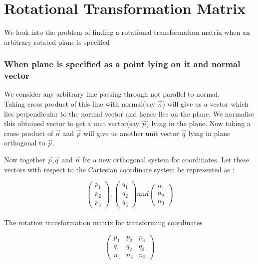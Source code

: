 \documentclass[a4paper,11pt,openany]{book}
\begin{document}
\chapter{Rotational Transformation Matrix}
We look into the problem of finding a rotational transformation matrix when an arbitrary rotated plane is specified 
\subsection{When plane is specified as a point lying on it and normal vector}
We consider any arbitrary line passing through not parallel to normal. \\
Taking cross product of this line with normal(say $\vec{n}$) will give us a vector which lies perpendicular to the normal vector and hence lies on the plane. We normalise this obtained vector to get a unit vector(say $\vec{p}$) lying in the plane.
Now taking a cross product of $\vec{n}$ and $\vec{p}$ will give us another unit vector $\vec{q}$ lying in plane orthogonal to $\vec{p}$.

Now together $\vec{p}$,$\vec{q}$ and $\vec{n}$ for a new orthogonal system for coordinates.
Let these vectors with respect to the Cartesian coordinate system be represented as :

\begin{equation}
\left(\begin{array}{c} p_1 \\ p_2 \\ p_3\end{array}\right),
\left(\begin{array}{c} q_1 \\ q_2 \\ q_3\end{array}\right) and
\left(\begin{array}{c} n_1 \\ n_2 \\ n_3\end{array}\right)
\end{equation} \\

The rotation transformation matrix for transforming coordinates 

\begin{equation}
\left(\begin{array}{ccc} p_1 & p_2 & p_3 \\ q_1 & q_2 & q_3 \\ n_1 & n_3 & n_3 \end{array}\right) 
\end{equation}
\end{document}
